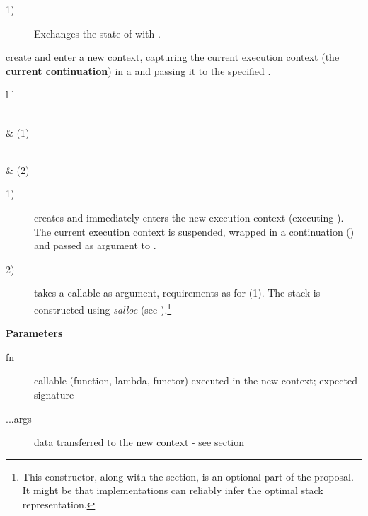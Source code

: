 \begin{description}
    \item[1)] Exchanges the state of  with .\\
\end{description}



create and enter a new context, capturing the current execution context (the
{\bfseries current continuation}) in a \cont and passing it to the
specified \entryfn.\\

\begin{tabular}{ l l }
    \midrule

    \\
     & (1)\\

    \midrule

    \\
     & (2)\\

    \midrule
\end{tabular}

\begin{description}
    \item[1)] creates and immediately enters the new execution context
              (executing ). The current execution context is suspended,
              wrapped in a continuation (\cont) and passed as argument to
              .
    \item[2)] takes a callable as argument, requirements as for (1). The stack
              is constructed using \emph{salloc}
              (see ).\footnote{This constructor, along with
              the  section, is an optional part of the
              proposal. It might be that implementations can reliably infer the
              optimal stack representation.}
\end{description}

{\bfseries Parameters}
\begin{description}
    \item[fn]      callable (function, lambda, functor) executed in the new
                   context; expected signature  
    \item[...args] data transferred to the new context - see section
                   \\
\end{description}

